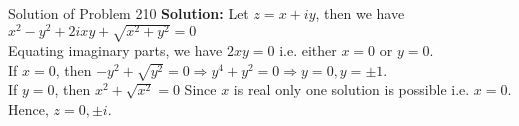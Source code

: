 \documentclass[aspectratio=169,8pt]{beamer}
\begin{document}
\begin{frame}{Solution of Problem 210}
  \textbf{Solution:} Let $z = x + iy$, then we have $x^2 - y^2 + 2ixy + \sqrt{x^2 + y^2} = 0$
  \\\vspace*{0.2cm}
  Equating imaginary parts, we have $2xy = 0$ i.e. either $x = 0$ or $y = 0$.
  \\\vspace*{0.2cm}
  If $x = 0$, then $-y^2 + \sqrt{y^2} = 0 \Rightarrow y^4 + y^2 = 0 \Rightarrow y = 0, y = \pm 1$.
  \\\vspace*{0.2cm}
  If $y = 0$, then $x^2 + \sqrt{x^2} = 0$ Since $x$ is real only one solution is possible i.e. $x = 0$.
  \\\vspace*{0.2cm}
  Hence, $z = 0, \pm i$.
\end{frame}
\end{document}
